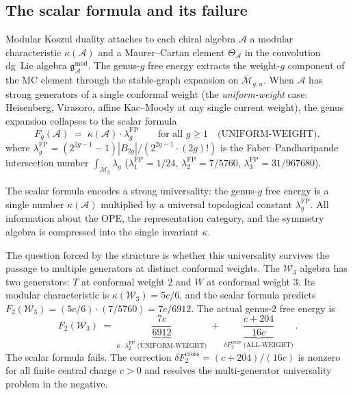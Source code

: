 \documentclass[11pt]{article}
\theoremstyle{definition}
\theoremstyle{remark}
\newcommand{\cA}{\mathcal{A}}
\newcommand{\cM}{\mathcal{M}}
\newcommand{\Walg}{\mathcal{W}}
\newcommand{\fg}{\mathfrak{g}}
\newcommand{\FP}{\mathrm{FP}}
\newcommand{\cross}{\mathrm{cross}}
\numberwithin{equation}{section}
\begin{document}
\subsection{The scalar formula and its failure}

Modular Koszul duality attaches to each chiral algebra
$\cA$ a modular characteristic $\kappa(\cA)$ and a
Maurer--Cartan element $\Theta_{\cA}$ in the convolution dg~Lie
algebra $\fg^{\mathrm{mod}}_{\cA}$.
The genus-$g$ free energy extracts the weight-$g$ component of
the MC element through the stable-graph expansion on
$\overline{\cM}_{g,n}$.
When $\cA$ has strong generators of a single conformal weight
(the \emph{uniform-weight} case: Heisenberg, Virasoro, affine
Kac--Moody at any single current weight), the genus expansion
collapses to the scalar formula
\begin{equation}\label{eq:intro-scalar}
 F_g(\cA)
 \;=\;
 \kappa(\cA) \cdot \lambda_g^{\FP}
 \qquad\text{for all } g \geq 1
 \quad\text{(UNIFORM-WEIGHT)},
\end{equation}
	where
$\lambda_g^{\FP}
 = (2^{2g-1}{-}1)|B_{2g}|/(2^{2g-1}\cdot(2g)!)$
is the Faber--Pandharipande intersection number
$\int_{\overline{\cM}_g} \lambda_g$
($\lambda_1^{\FP} = 1/24$,
$\lambda_2^{\FP} = 7/5760$,
$\lambda_3^{\FP} = 31/967680$).

The scalar formula encodes a strong universality: the genus-$g$
free energy is a single number $\kappa(\cA)$ multiplied by a
universal topological constant $\lambda_g^{\FP}$.
All information about the OPE, the representation category, and
the symmetry algebra is compressed into the single invariant
$\kappa$.

The question forced by the structure is whether this universality
survives the passage to multiple generators at distinct conformal
weights.
The $\Walg_3$ algebra has two generators:
$T$ at conformal weight $2$ and $W$ at conformal weight $3$.
Its modular characteristic is
	$\kappa(\Walg_3) = 5c/6$,
and the scalar formula predicts
$F_2(\Walg_3) = (5c/6) \cdot (7/5760) = 7c/6912$.
The actual genus-$2$ free energy is
\begin{equation}\label{eq:intro-w3-genus2}
 F_2(\Walg_3)
 \;=\;
 \underbrace{\frac{7c}{6912}}_{\kappa \cdot \lambda_2^{\FP}
 \;\text{(UNIFORM-WEIGHT)}}
 \;+\;
 \underbrace{\frac{c+204}{16c}}_{\delta F_2^{\cross}
 \;\text{(ALL-WEIGHT)}}\,.
\end{equation}
The scalar formula fails. The correction
$\delta F_2^{\cross} = (c{+}204)/(16c)$ is nonzero for
all finite central charge $c > 0$ and resolves the
multi-generator universality problem in the negative.
\end{document}
